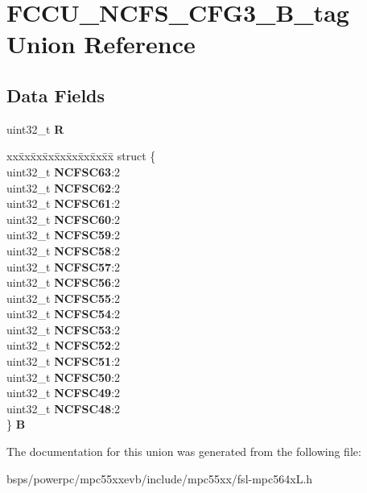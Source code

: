 \hypertarget{unionFCCU__NCFS__CFG3__32B__tag}{}\section{F\+C\+C\+U\+\_\+\+N\+C\+F\+S\+\_\+\+C\+F\+G3\+\_\+B\+\_\+tag Union Reference}
\label{unionFCCU__NCFS__CFG3__32B__tag}
\subsection*{Data Fields}
\begin{DoxyCompactItemize}
\item 
\mbox{\label{unionFCCU__NCFS__CFG3__32B__tag_a00baaaeed78f2411d922258fd7e50b1b}} 
uint32\+\_\+t {\bfseries R}
\item 
\mbox{\label{unionFCCU__NCFS__CFG3__32B__tag_a9259962caebe5ff80bef05109e5a0168}} 
\begin{tabbing}
xx\=xx\=xx\=xx\=xx\=xx\=xx\=xx\=xx\=\kill
struct \{\\
\>uint32\_t {\bfseries NCFSC63}:2\\
\>uint32\_t {\bfseries NCFSC62}:2\\
\>uint32\_t {\bfseries NCFSC61}:2\\
\>uint32\_t {\bfseries NCFSC60}:2\\
\>uint32\_t {\bfseries NCFSC59}:2\\
\>uint32\_t {\bfseries NCFSC58}:2\\
\>uint32\_t {\bfseries NCFSC57}:2\\
\>uint32\_t {\bfseries NCFSC56}:2\\
\>uint32\_t {\bfseries NCFSC55}:2\\
\>uint32\_t {\bfseries NCFSC54}:2\\
\>uint32\_t {\bfseries NCFSC53}:2\\
\>uint32\_t {\bfseries NCFSC52}:2\\
\>uint32\_t {\bfseries NCFSC51}:2\\
\>uint32\_t {\bfseries NCFSC50}:2\\
\>uint32\_t {\bfseries NCFSC49}:2\\
\>uint32\_t {\bfseries NCFSC48}:2\\
\} {\bfseries B}\\

\end{tabbing}\end{DoxyCompactItemize}


The documentation for this union was generated from the following file\+:\begin{DoxyCompactItemize}
\item 
bsps/powerpc/mpc55xxevb/include/mpc55xx/fsl-\/mpc564x\+L.\+h\end{DoxyCompactItemize}
